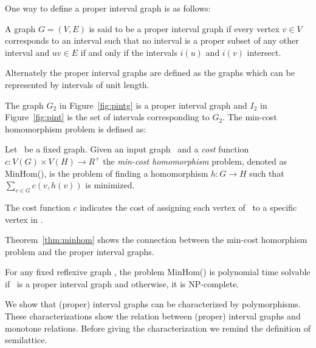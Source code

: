One way to define a proper interval graph is as follows:

\begin{defi}
A graph \(G=(V,E)\) is said to be a proper interval graph if every vertex \(v \in V\)
corresponds to an interval such that no interval is a proper subset of any other interval
and \(uv \in E\) if and only if the intervals \(i(u)\) and \(i(v)\) intersect.
\end{defi}

Alternately the proper interval graphs are defined as the graphs which can be represented 
by intervals of unit length.

\begin{figure}[h]
\hfill
\subfigure[\ensuremath{G_2}]{\label{fig:pintg}}\hfill 
\subfigure[\ensuremath{I_2}]{\label{fig:pint}}\hfill 
\end{figure}

The graph \(G_2\) in Figure~\ref{fig:pintg} is a proper interval graph and
\(I_2\) in Figure~\ref{fig:pint} is the set of intervals corresponding to \(G_2\)\@.
The min-cost homomorphism problem is defined as:

\begin{defi} [MinHom]
Let \mH\ be a fixed graph. Given an input graph \mG\ and a \emph{cost} function
\(c: V(G) \times V(H) \to R^+\) the \emph{min-cost homomorphism} problem,
denoted as MinHom(\mH), is the problem of finding a homomorphism 
\(h:G\to H\) such that \(\sum_{v\in G} c(v, h(v))\) is minimized.
\end{defi}

The cost function \(c\) indicates the cost of assigning each vertex of \mG\ 
to a specific vertex in \mH\@. 

Theorem~\ref{thm:minhom} shows the connection between the min-cost homorphism problem 
and the proper interval graphs.

\begin{theorem} [TODO] \label{thm:minhom}
For any fixed reflexive graph \mH, the problem MinHom(\mH) is polynomial time solvable if
\mH\ is a proper interval graph and otherwise, it is NP-complete.
\end{theorem}

We show that (proper) interval graphs can be characterized by polymorphisms. 
These characterizations show the relation between (proper) interval graphs and monotone relations. 
Before giving the characterization we remind the definition of semilattice.

